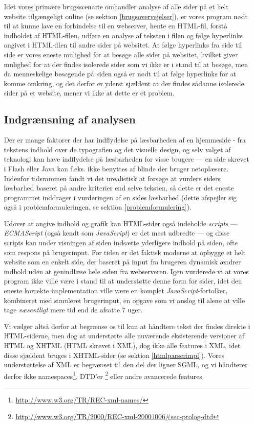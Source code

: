 \documentclass[a4paper,oneside,article]{memoir}
\begin{document}
Idet vores primære brugsscenarie omhandler analyse af alle sider på et
helt website tilgængeligt online (se sektion \ref{brugsovervejelser}),
er vores program nødt til at kunne lave en
forbindelse til en webserver, hente en HTML-fil, forstå indholdet af
HTML-filen, udføre en analyse af teksten i filen og følge hyperlinks
angivet i HTML-filen til andre sider på websitet. At følge hyperlinks
fra side til side er vores eneste mulighed for at besøge alle sider på
websitet, hvilket giver mulighed for at der findes isolerede sider som
vi ikke er i stand til at besøge, men da menneskelige besøgende på
siden også er nødt til at følge hyperlinks for at komme omkring, og
det derfor er yderst sjældent at der findes sådanne isolerede sider på et
website, mener vi ikke at dette er et problem.

\subsection{Indgrænsning af analysen}
\label{begraensning}
Der er mange faktorer der har indflydelse på læsbarheden af en
hjemmeside - fra tekstens indhold over de typografien og det visuelle
design, og selv valget af teknologi kan have indflydelse på
læsbarheden for visse brugere --- en side skrevet i Flash eller Java
kan f.eks. ikke benyttes af blinde der bruger netoplæsere. Indenfor
tidsrammen fandt vi det urealistisk at forsøge at vurdere siders
læsbarhed baseret på andre kriterier end selve teksten, så dette er
det eneste programmet inddrager i vurderingen af en sides læsbarhed
(dette afspejler sig også i problemformuleringen, se sektion
\ref{problemformulering}).

Udover at angive indhold og grafik kan HTML-sider også indeholde
\textit{scripts} --- \textit{ECMAScript} (også kendt som
\textit{JavaScript}) er det mest udbredte --- og disse scripts kan
under visningen af siden indsætte yderligere indhold på siden, ofte
som respons på brugerinput. For tiden er det faktisk moderne at
opbygge et helt website som en enkelt side, der baseret på input fra
brugeren dynamisk ændrer indhold uden at genindlæse hele siden fra
webserveren. Igen vurderede vi at vores program ikke ville være i
stand til at understøtte denne form for sider, idet den eneste
korrekte implementation ville være en komplet
\textit{JavaScript}-fortolker, kombineret med simuleret brugerinput,
en opgave som vi anslog til alene at ville tage \textit{væsentligt}
mere tid end de afsatte 7 uger.

Vi vælger altså derfor at begrænse os til kun at håndtere tekst der
findes direkte i HTML-siderne, men dog at understøtte alle nuværende
eksisterende versioner af HTML og XHTML (HTML skrevet i XML), dog ikke
alle features i XML, idet disse sjældent bruges i XHTML-sider (se
sektion \ref{htmlparserimpl}). Vores understøttelse af XML er
begrænset til den del der ligner SGML, og vi håndterer derfor ikke
namespaces\footnote{\url{http://www.w3.org/TR/REC-xml-names/}},
DTD'er \footnote{\url{http://www.w3.org/TR/2000/REC-xml-20001006\#sec-prolog-dtd}}
eller andre avancerede features.
\end{document}
